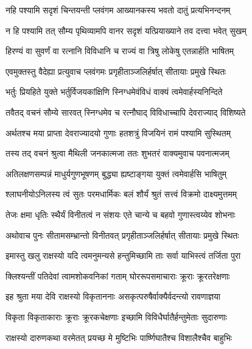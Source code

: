 \twolineshloka
{नहि पश्यामि सदृशं चिन्तयन्ती प्लवंगम}
{आख्यानकस्य भवतो दातुं प्रत्यभिनन्दनम्} %

\twolineshloka
{न हि पश्यामि तत् सौम्य पृथिव्यामपि वानर}
{सदृशं यत्प्रियाख्याने तव दत्त्वा भवेत् सुखम्} %

\twolineshloka
{हिरण्यं वा सुवर्णं वा रत्नानि विविधानि च}
{राज्यं वा त्रिषु लोकेषु एतन्नार्हति भाषितम्} %

\twolineshloka
{एवमुक्तस्तु वैदेह्या प्रत्युवाच प्लवंगमः}
{प्रगृहीताञ्जलिर्हर्षात् सीतायाः प्रमुखे स्थितः} %

\twolineshloka
{भर्तुः प्रियहिते युक्ते भर्तुर्विजयकांक्षिणि}
{स्निग्धमेवंविधं वाक्यं त्वमेवार्हस्यनिन्दिते} %

\twolineshloka
{तवैतद् वचनं सौम्ये सारवत् स्निग्धमेव च}
{रत्नौघाद् विविधाच्चापि देवराज्याद् विशिष्यते} %

\twolineshloka
{अर्थतश्च मया प्राप्ता देवराज्यादयो गुणाः}
{हतशत्रुं विजयिनं रामं पश्यामि सुस्थितम्} %

\twolineshloka
{तस्य तद् वचनं श्रुत्वा मैथिली जनकात्मजा}
{ततः शुभतरं वाक्यमुवाच पवनात्मजम्} %

\twolineshloka
{अतिलक्षणसम्पन्नं माधुर्यगुणभूषणम्}
{बुद्ध्या ह्यष्टाङ्गया युक्तं त्वमेवार्हसि भाषितुम्} %

\twolineshloka
{श्लाघनीयोऽनिलस्य त्वं सुतः परमधार्मिकः}
{बलं शौर्यं श्रुतं सत्त्वं विक्रमो दाक्ष्यमुत्तमम्} %

\twolineshloka
{तेजः क्षमा धृतिः स्थैर्यं विनीतत्वं न संशयः}
{एते चान्ये च बहवो गुणास्त्वय्येव शोभनाः} %

\twolineshloka
{अथोवाच पुनः सीतामसम्भ्रान्तो विनीतवत्}
{प्रगृहीताञ्जलिर्हर्षात् सीतायाः प्रमुखे स्थितः} %

\twolineshloka
{इमास्तु खलु राक्षस्यो यदि त्वमनुमन्यसे}
{हन्तुमिच्छामि ताः सर्वा याभिस्त्वं तर्जिता पुरा} %

\twolineshloka
{क्लिश्यन्तीं पतिदेवां त्वामशोकवनिकां गताम्}
{घोररूपसमाचाराः क्रूराः क्रूरतरेक्षणाः} %

\twolineshloka
{इह श्रुता मया देवि राक्षस्यो विकृताननाः}
{असकृत्परुषैर्वाक्यैर्वदन्त्यो रावणाज्ञया} %

\twolineshloka
{विकृता विकृताकाराः क्रूराः क्रूरकचेक्षणाः}
{इच्छामि विविधैर्घातैर्हन्तुमेताः सुदारुणाः} %

\twolineshloka
{राक्षस्यो दारुणकथा वरमेतत् प्रयच्छ मे}
{मुष्टिभिः पार्ष्णिघातैश्च विशालैश्चैव बाहुभिः} %

